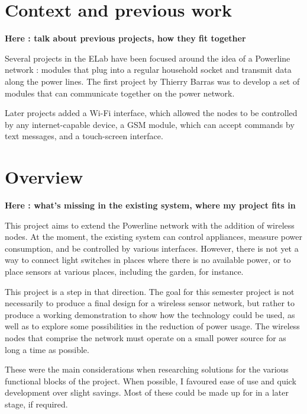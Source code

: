 \section{Context and previous work}
\textbf{Here : talk about previous projects, how they fit together}


Several projects in the ELab have been focused around the idea of a Powerline
network : modules that plug into a regular household socket and transmit data
along the power lines. The first project by Thierry Barras \cite{barras2009} was
to develop a set of modules that can communicate together on the power network.

Later projects added a Wi-Fi interface, which allowed the nodes to be controlled
by any internet-capable device, a GSM module, which can accept commands by text
messages, and a touch-screen interface.


\section{Overview}
\textbf{Here : what's missing in the existing system, where my project fits in}

This project aims to extend the Powerline network with the addition of wireless
nodes. At the moment, the existing system can control appliances, measure power
consumption, and be controlled by various interfaces. However, there is not yet
a way to connect light switches in places where there is no available power, or
to place sensors at various places, including the garden, for instance.

This project is a step in that direction. The goal for this semester project is
not necessarily to produce a final design for a wireless sensor network, but
rather to produce a working demonstration to show how the technology could be
used, as well as to explore some possibilities in the reduction of power usage.
The wireless nodes that comprise the network must operate on a small power
source for as long a time as possible.

These were the main considerations when researching solutions for the various
functional blocks of the project. When possible, I favoured ease of use and
quick development over slight savings. Most of these could be made up for in a
later stage, if required.

